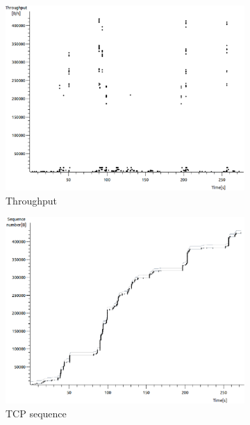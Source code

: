 \documentclass[conference,a4paper]{../../sty/IEEEtran}
\begin{document}
\begin{figure}
 \centering
 \begin{subfigure}[b]{0.2\textwidth}
  \includegraphics[width=\textwidth]{s2-1_thru}
  \caption{Throughput}
 \end{subfigure}
 \begin{subfigure}[b]{0.2\textwidth}
  \includegraphics[width=\textwidth]{s2-1_seq}
  \caption{TCP sequence}
 \end{subfigure}
 \begin{subfigure}[b]{0.2\textwidth}

\end{subfigure}
\end{figure}
\end{document}
